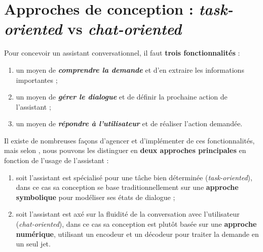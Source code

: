 	
	\section{Approches de conception : \textit{task-oriented} vs \textit{chat-oriented}}
	\label{annex:B.2-ANNEXE-CHATBOTS-APPROCHES}
	
		Pour concevoir un assistant conversationnel, il faut \textbf{trois fonctionnalités} :
		\begin{enumerate}
			\item un moyen de \textcolor{colorCarrotOrange}{\textit{\textbf{comprendre la demande}}} et d'en extraire les informations importantes ;
			\item un moyen de \textcolor{colorDarkPastelGreen}{\textit{\textbf{gérer le dialogue}}} et de définir la prochaine action de l'assistant ;
			\item un moyen de \textcolor{colorSilverLakeBlue}{\textit{\textbf{répondre à l'utilisateur}}} et de réaliser l'action demandée.
		\end{enumerate}
		\vspace{0.5cm}
		
		Il existe de nombreuses façons d'agencer et d'implémenter de ces fonctionnalités, mais selon \cite{chen-etal:2017:survey-dialogue-systems}, nous pouvons les distinguer en \textbf{deux approches principales} en fonction de l'usage de l'assistant :
		\begin{enumerate}
			\item soit l'assistant est spécialisé pour une tâche bien déterminée (\textit{task-oriented}), dans ce cas sa conception se base traditionnellement sur une \textbf{approche symbolique} pour modéliser ses états de dialogue ;
			\item soit l'assistant est axé sur la fluidité de la conversation avec l'utilisateur (\textit{chat-oriented}), dans ce cas sa conception est plutôt basée sur une \textbf{approche numérique}, utilisant un encodeur et un décodeur pour traiter la demande en un seul jet.
		\end{enumerate}
		
